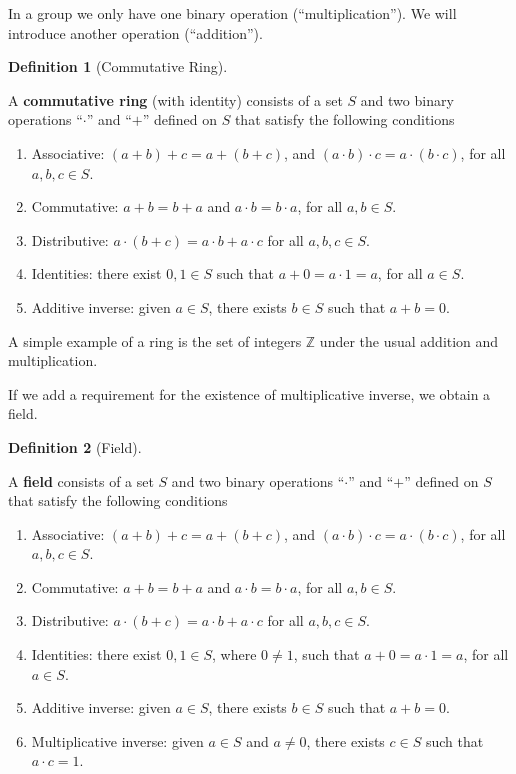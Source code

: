\documentclass[
]{book}
\theoremstyle{definition}
\newtheorem{definition}{Definition}[chapter]
\theoremstyle{definition}
\theoremstyle{definition}
\theoremstyle{definition}
\theoremstyle{remark}
\begin{document}
In a group we only have one binary operation (``multiplication''). We will introduce another operation (``addition'').

\begin{definition}[Commutative Ring]
\protect\hypertarget{def:Ring}{}\label{def:Ring}

A \textbf{commutative ring} (with identity) consists of a set \(S\) and two binary operations ``\(\cdot\)'' and ``\(+\)'' defined on \(S\) that satisfy the following conditions

\begin{enumerate}
\def\labelenumi{\arabic{enumi}.}
\item
  Associative: \((a+b)+c = a + (b+c)\), and \((a \cdot b) \cdot c = a \cdot (b \cdot c)\), for all \(a,b,c \in S\).
\item
  Commutative: \(a+b=b+a\) and \(a\cdot b = b \cdot a\), for all \(a,b \in S\).
\item
  Distributive: \(a \cdot (b+c) = a\cdot b + a \cdot c\) for all \(a,b,c \in S\).
\item
  Identities: there exist \(0, 1 \in S\) such that \(a + 0 = a \cdot 1 = a\), for all \(a \in S\).
\item
  Additive inverse: given \(a \in S\), there exists \(b \in S\) such that \(a + b = 0\).
\end{enumerate}

\end{definition}

A simple example of a ring is the set of integers \(\mathbb{Z}\) under the usual addition and multiplication.

If we add a requirement for the existence of multiplicative inverse, we obtain a field.

\begin{definition}[Field]
\protect\hypertarget{def:Field}{}\label{def:Field}

A \textbf{field} consists of a set \(S\) and two binary operations ``\(\cdot\)'' and ``\(+\)'' defined on \(S\) that satisfy the following conditions

\begin{enumerate}
\def\labelenumi{\arabic{enumi}.}
\item
  Associative: \((a+b)+c = a + (b+c)\), and \((a \cdot b) \cdot c = a \cdot (b \cdot c)\), for all \(a,b,c \in S\).
\item
  Commutative: \(a+b=b+a\) and \(a\cdot b = b \cdot a\), for all \(a,b \in S\).
\item
  Distributive: \(a \cdot (b+c) = a\cdot b + a \cdot c\) for all \(a,b,c \in S\).
\item
  Identities: there exist \(0, 1 \in S\), where \(0 \neq 1\), such that \(a + 0 = a \cdot 1 = a\), for all \(a \in S\).
\item
  Additive inverse: given \(a \in S\), there exists \(b \in S\) such that \(a + b = 0\).
\item
  Multiplicative inverse: given \(a \in S\) and \(a \neq 0\), there exists \(c \in S\) such that \(a \cdot c = 1\).
\end{enumerate}

\end{definition}
\end{document}
